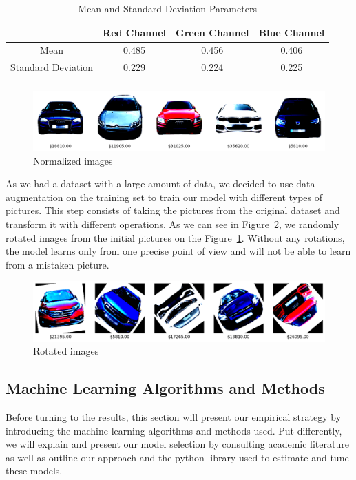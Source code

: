 \documentclass[12pt]{article}
\begin{document}
\begin{table}[h]
    \centering
    \begin{tabular}{cccc}
        \toprule
        & Red Channel & Green Channel & Blue Channel \\
        \midrule
        Mean & 0.485 & 0.456 & 0.406 \\
        Standard Deviation & 0.229 & 0.224 & 0.225 \\
        \bottomrule
        \label{mean std}
    \end{tabular}
    \caption{Mean and Standard Deviation Parameters}
\end{table}

\FloatBarrier
\begin{figure}[ht]
    \centering
    \includegraphics[width=1\textwidth]{testing images.png}
    \caption{Normalized images}
    \label{Normalized images}
\end{figure}
\FloatBarrier
 

\noindent As we had a dataset with a large amount of data, we decided to use data augmentation on the training set to train our model with different types of pictures. This step consists of taking the pictures from the original dataset and transform it with different operations. As we can see in Figure~\ref{training images}, we randomly rotated images from the initial pictures on the Figure~\ref{Normalized images}. Without any rotations, the model learns only from one precise point of view and will not be able to learn from a mistaken picture. 


\FloatBarrier
\begin{figure}[ht]
    \centering
    \includegraphics[width=1\textwidth]{training images.png}
    \caption{Rotated images}
    \label{training images}
\end{figure}
\FloatBarrier




\subsection{Machine Learning Algorithms and Methods}
Before turning to the results, this section will present our empirical strategy by introducing the machine learning algorithms and methods used. Put differently, we will explain and present our model selection by consulting academic literature as well as outline our approach and the python library used to estimate and tune these models.
\end{document}

